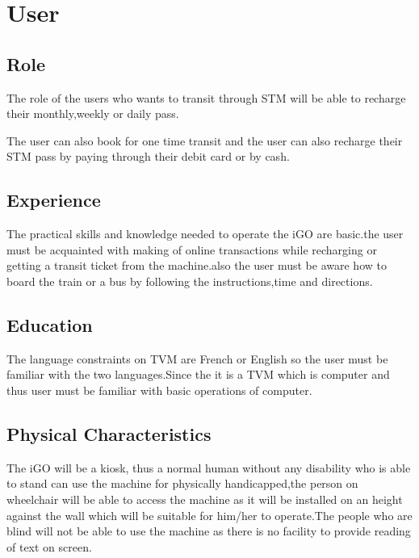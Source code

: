 \documentclass[12pt]{report}
\begin{document}
\par



\section{User}

\subsection{Role}

The role of the users who wants to transit through STM will be able to recharge their monthly,weekly or daily pass.\par

The user can also book for one time transit and the user can also recharge their STM pass by paying through their debit card or by cash.\par

\subsection{Experience}

The practical skills and knowledge needed to operate the iGO are basic.the user must be acquainted with making of online transactions while recharging or getting a transit ticket from the machine.also the user must be aware how to board the train or a bus by following the instructions,time and directions.\par


\subsection{Education}

The language constraints on TVM are French or English so the user must be familiar with the two languages.Since the it is a TVM which is computer and thus user must be familiar with basic operations of computer.\par

\subsection{Physical Characteristics}

The iGO will be a kiosk, thus a normal human without any disability who is able to stand can use the machine for physically handicapped,the person on wheelchair will be able to access the machine as it will be installed on an height against the wall which will be suitable for him/her to operate.The people who are blind will not be able to use the machine as there is no facility to provide reading of text on screen.\par
\end{document}
